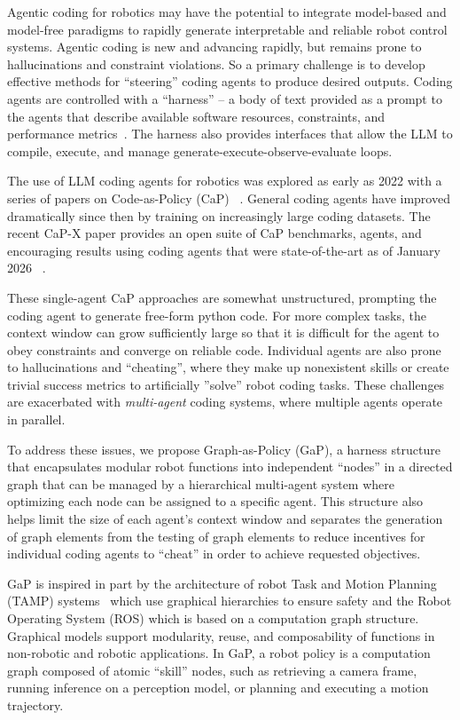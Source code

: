 Agentic coding for robotics may have the potential to integrate model-based and model-free paradigms to rapidly generate interpretable and reliable robot control systems. Agentic coding is new and advancing rapidly, but remains prone to hallucinations and constraint violations. So a primary challenge is to develop effective methods for ``steering'' coding agents to produce desired outputs.  Coding agents are controlled with a ``harness'' -- a body of text provided as a prompt to the agents that describe available software resources, constraints, and performance metrics~\cite{anthropicharness}.  The harness also provides interfaces that allow the LLM to compile, execute, and manage generate-execute-observe-evaluate loops.

The use of LLM coding agents for robotics was explored as early as 2022 with a series of papers on 
Code-as-Policy (CaP) ~\cite{codeaspolicies2022, YinG-RSS-25}.
General coding agents have improved dramatically since then by training on increasingly large coding datasets.  The recent CaP-X paper provides an open suite of CaP benchmarks, agents, and encouraging results using coding agents that were state-of-the-art as of January 2026 ~\cite{fu2026cap}.

These single-agent CaP approaches are somewhat unstructured, prompting the coding agent to generate free-form python code.  For more complex tasks, the context window can grow sufficiently large so that it is difficult for the agent to obey constraints and converge on reliable code.  Individual agents are also prone to hallucinations and ``cheating'', where they make up nonexistent skills or create trivial success metrics to artificially ''solve'' robot coding tasks.  These challenges are exacerbated with \emph{multi-agent} coding systems, where multiple agents operate in parallel.

To address these issues, we propose Graph-as-Policy (GaP), a harness structure that encapsulates modular robot functions into independent ``nodes'' in a directed graph that can be managed by a hierarchical multi-agent system where optimizing each node can be assigned to a specific agent.  This structure also helps limit the size of each agent's context window and separates the generation of graph elements from the testing of graph elements to reduce incentives for individual coding agents to ``cheat'' in order to achieve requested objectives.

GaP is inspired in part by the architecture of robot Task and Motion Planning (TAMP) systems~\cite{kaelbling2011hierarchical,garrett2021integrated, shen2026tiptop} which use graphical hierarchies to ensure safety and the Robot Operating System (ROS)\cite{macenski2022robot} which is based on a computation graph structure.  Graphical models support modularity, reuse, and composability of functions in non-robotic and robotic applications.   In GaP, a robot policy is a computation graph composed of atomic ``skill'' nodes, such as retrieving a camera frame, running inference on a perception model, or planning and executing a motion trajectory. 


